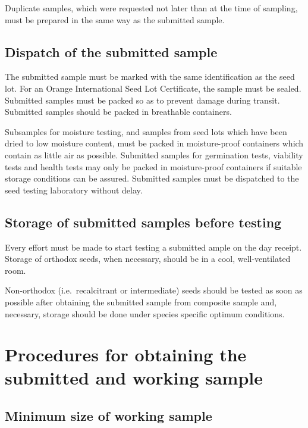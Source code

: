 \documentclass[
]{book}
\begin{document}
Duplicate samples, which were requested not later than at the time of sampling, must be prepared in the same way as the submitted sample.

\hypertarget{dispatch-of-the-submitted-sample}{%
\subsection{Dispatch of the submitted sample}\label{dispatch-of-the-submitted-sample}}

The submitted sample must be marked with the same identification as the seed lot. For an Orange International Seed Lot Certificate, the sample must be sealed. Submitted samples must be packed so as to prevent damage during transit. Submitted samples should be packed in breathable containers.

Subsamples for moisture testing, and samples from seed lots which have been dried to low moisture content, must be packed in moisture-proof containers which contain as little air as possible. Submitted samples for germination tests, viability tests and health tests may only be packed in moisture-proof containers if suitable storage conditions can be assured. Submitted samples must be dispatched to the seed testing laboratory without delay.

\hypertarget{storage-of-submitted-samples-before-testing}{%
\subsection{Storage of submitted samples before testing}\label{storage-of-submitted-samples-before-testing}}

Every effort must be made to start testing a submitted ample on the day receipt. Storage of orthodox seeds, when necessary, should be in a cool, well-ventilated room.

Non-orthodox (i.e.~recalcitrant or intermediate) seeds should be tested as soon as possible after obtaining the submitted sample from composite sample and, necessary, storage should be done under species specific optimum conditions.

\hypertarget{procedures-for-obtaining-the-submitted-and-working-sample}{%
\section{Procedures for obtaining the submitted and working sample}\label{procedures-for-obtaining-the-submitted-and-working-sample}}

\hypertarget{minimum-size-of-working-sample}{%
\subsection{Minimum size of working sample}\label{minimum-size-of-working-sample}}
\end{document}
